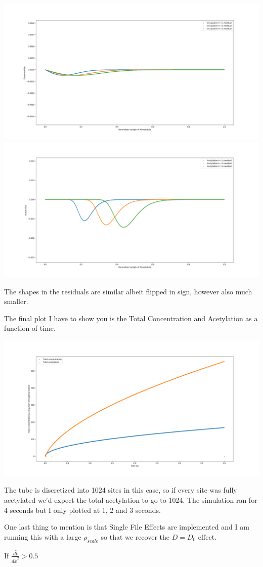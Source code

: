 \documentclass[]{article}
\begin{document}
\includegraphics[width=\linewidth]{OccupationNoSteadyStateMultiplicationResidual}
\includegraphics[width=\linewidth]{AcetylationNoSteadyStateMultiplicationResidual}

The shapes in the residuals are similar albeit flipped in sign, however also much smaller.

The final plot I have to show you is the Total Concentration and Acetylation as a function of time.

\includegraphics[width=\linewidth]{TotalConcentrationandAcetylationasFunctionofTime}

The tube is discretized into 1024 sites in this case, so if every site was fully acetylated we'd expect the total acetylation to go to 1024. The simulation ran for 4 seconds but I only plotted at 1, 2 and 3 seconds. 

One last thing to mention is that Single File Effects are implemented and I am running this with a large $\rho_{scale}$ so that we recover the $D=D_0$ effect.

If $\frac{d\tilde{t}}{d\tilde{x}^2} > 0.5$
\end{document}
